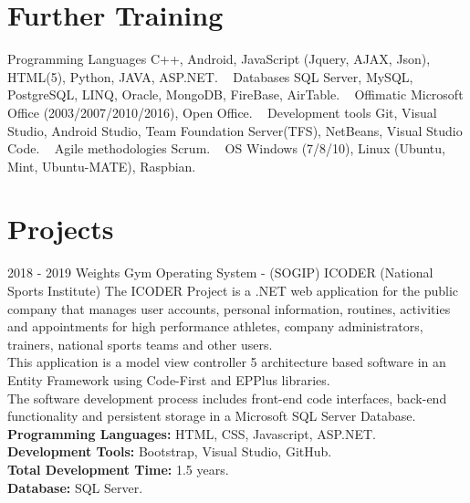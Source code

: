 \documentclass[]{friggeri-cv}
\begin{document}
\section{Further Training}
\begin{entrylist}
    \entry
    {}
    {Programming Languages}
    {}
    {C++, Android, JavaScript (Jquery, AJAX, Json), HTML(5), Python, JAVA, ASP.NET.}
    ~
    \entry
    {}
    {Databases}
    {}
    {SQL Server, MySQL, PostgreSQL, LINQ, Oracle, MongoDB, FireBase, AirTable.}
    ~
    \entry
    {}
    {Offimatic}
    {}
    {Microsoft Office (2003/2007/2010/2016), Open Office.}
    ~
    \entry
    {}
    {Development tools}
    {}
    {Git, Visual Studio, Android Studio, Team Foundation Server(TFS), NetBeans, Visual Studio Code.}
    ~
    \entry
    {}
    {Agile methodologies}
    {}
    {Scrum.}
    ~
    \entry
    {}
    {OS}
    {}
    {Windows (7/8/10), Linux (Ubuntu, Mint, Ubuntu-MATE), Raspbian.}
    
\end{entrylist}

\section{Projects}
\begin{entrylist}
    \entry
    {2018 - 2019}
    {Weights Gym Operating System - (SOGIP)}
    {ICODER (National Sports Institute)}
    {The ICODER Project is a .NET web application for the public company that manages user accounts, personal information, routines, activities and appointments for high performance athletes, company administrators, trainers, national sports teams and other users. \\
    This application is a model view controller 5 architecture based software in an Entity Framework using Code-First and EPPlus libraries. \\
    The software development process includes front-end code interfaces, back-end functionality and persistent storage in a Microsoft SQL Server Database. \\
    \textbf{Programming Languages:} HTML, CSS, Javascript, ASP.NET. \\
    \textbf{Development Tools:} Bootstrap, Visual Studio, GitHub. \\
    \textbf{Total Development Time:} 1.5 years. \\
    \textbf{Database:} SQL Server. } \\
    
    
\end{entrylist}
\end{document}
